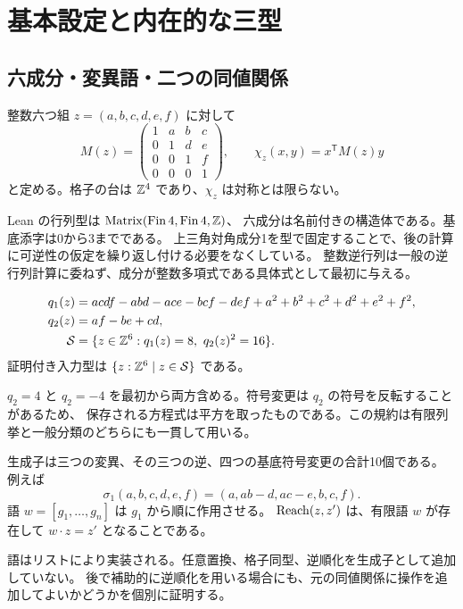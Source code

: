 \section{基本設定と内在的な三型}
\subsection{六成分・変異語・二つの同値関係}
\begin{definition}\label{bp:def-six}
\leanok
整数六つ組 $z=(a,b,c,d,e,f)$ に対して
\[
M(z)=\begin{pmatrix}1&a&b&c\\0&1&d&e\\0&0&1&f\\0&0&0&1\end{pmatrix},
\qquad \chi_z(x,y)=x^{\mathsf T}M(z)y
\]
と定める。格子の台は $\mathbb Z^4$ であり、$\chi_z$ は対称とは限らない。
\end{definition}
Lean の行列型は $\operatorname{Matrix}(\operatorname{Fin}4,\operatorname{Fin}4,\mathbb Z)$、
六成分は名前付きの構造体である。基底添字は0から3までである。
上三角対角成分1を型で固定することで、後の計算に可逆性の仮定を繰り返し付ける必要をなくしている。
整数逆行列は一般の逆行列計算に委ねず、成分が整数多項式である具体式として最初に与える。

\begin{definition}[二方程式の解]\label{bp:def-solution}
\leanok
{}
\begin{align*}
q_1(z)&=acdf-abd-ace-bcf-def+a^2+b^2+c^2+d^2+e^2+f^2,\\
q_2(z)&=af-be+cd,\\
\mathcal S&=\{z\in\mathbb Z^6:q_1(z)=8,\ q_2(z)^2=16\}.
\end{align*}
証明付き入力型は $\{z:\mathbb Z^6\mid z\in\mathcal S\}$ である。
\end{definition}
$q_2=4$ と $q_2=-4$ を最初から両方含める。符号変更は $q_2$ の符号を反転することがあるため、
保存される方程式は平方を取ったものである。この規約は有限列挙と一般分類のどちらにも一貫して用いる。

\begin{definition}[実際の有限変異語]\label{bp:def-reachable}
\leanok
{}
生成子は三つの変異、その三つの逆、四つの基底符号変更の合計10個である。
例えば
\[
\sigma_1(a,b,c,d,e,f)=(a,ab-d,ac-e,b,c,f).
\]
語 $w=[g_1,\ldots,g_n]$ は $g_1$ から順に作用させる。
$\operatorname{Reach}(z,z')$ は、有限語 $w$ が存在して $w\cdot z=z'$ となることである。
\end{definition}
語はリストにより実装される。任意置換、格子同型、逆順化を生成子として追加していない。
後で補助的に逆順化を用いる場合にも、元の同値関係に操作を追加してよいかどうかを個別に証明する。

